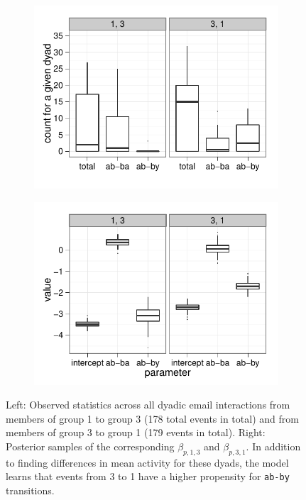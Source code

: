 \documentclass{article}
\begin{document}
\begin{figure}[t]
\centering
\begin{subfigure}[b]{0.35\textwidth}
\centering
\includegraphics[scale=.5]{../figs/eckmann-small/example-obs-stats}
\end{subfigure}
\qquad
\begin{subfigure}[b]{0.35\textwidth}
\centering
\includegraphics[scale=.5]{../figs/eckmann-small/example-estimates}
\end{subfigure}

\caption{%
 Left: Observed statistics across all dyadic email interactions from members of group 1 to group 3 (178 total events in total) and from members of group 3 to group 1 (179 events in total).  Right: Posterior samples of the corresponding $\beta_{p,1,3}$ and $\beta_{p,3,1}$.  In addition to finding differences in mean activity for these dyads, the model learns that events from 3 to 1 have a higher propensity for \texttt{ab-by} transitions.}
\label{fig:posteriorparams}
\end{figure}
\end{document}
